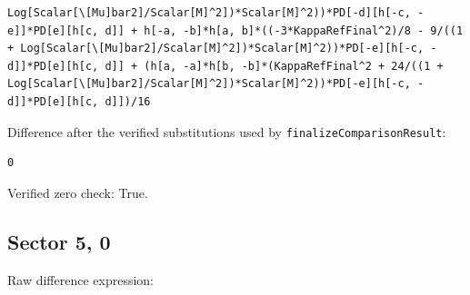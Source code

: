 \documentclass[11pt]{article}
\begin{document}
\begin{verbatim}
Log[Scalar[\[Mu]bar2]/Scalar[M]^2])*Scalar[M]^2))*PD[-d][h[-c, -e]]*PD[e][h[c, d]] + h[-a, -b]*h[a, b]*((-3*KappaRefFinal^2)/8 - 9/((1 + Log[Scalar[\[Mu]bar2]/Scalar[M]^2])*Scalar[M]^2))*PD[-e][h[-c, -d]]*PD[e][h[c, d]] + (h[a, -a]*h[b, -b]*(KappaRefFinal^2 + 24/((1 + Log[Scalar[\[Mu]bar2]/Scalar[M]^2])*Scalar[M]^2))*PD[-e][h[-c, -d]]*PD[e][h[c, d]])/16
\end{verbatim}
Difference after the verified substitutions used by \texttt{finalizeComparisonResult}:
\begin{verbatim}
0
\end{verbatim}
Verified zero check: True.

\subsection*{Sector {5, 0}}
Raw difference expression:
\end{document}
